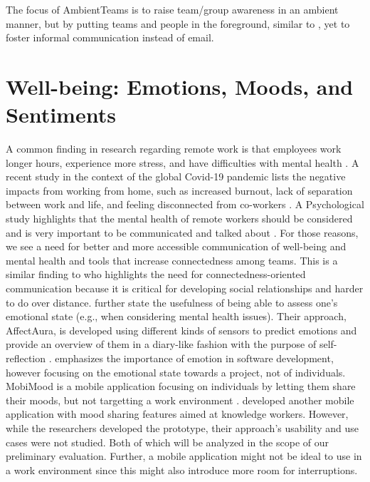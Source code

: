The focus of AmbientTeams is to raise team/group awareness in an ambient manner, but by putting teams and people in the foreground, similar to \autocite{whittaker2004contactmap}, yet to foster informal communication instead of email.

\section{Well-being: Emotions, Moods, and Sentiments}
A common finding in research regarding remote work is that employees work longer hours, experience more stress, and have difficulties with mental health \autocite{mswellbeing, mulki2009set, qualtricksmental}. A recent study in the context of the global Covid-19 pandemic lists the negative impacts from working from home, such as increased burnout, lack of separation between work and life, and feeling disconnected from co-workers \autocite{mswellbeing}. A Psychological study highlights that the mental health of remote workers should be considered and is very important to be communicated and talked about \autocite{grant2013exploration}. For those reasons, we see a need for better and more accessible communication of well-being and mental health and tools that increase connectedness among teams. This is a similar finding to \textcite{kuwabara2002connectedness} who highlights the need for connectedness-oriented communication because it is critical for developing social relationships and harder to do over distance. \textcite{mcduff2012affectaura} further state the usefulness of being able to assess one's emotional state (e.g., when considering mental health issues). Their approach, AffectAura, is developed using different kinds of sensors to predict emotions and provide an overview of them in a diary-like fashion with the purpose of self-reflection \autocite{dullemond2013fixing}. \textcite{guzman2013towards} emphasizes the importance of emotion in software development, however focusing on the emotional state towards a project, not of individuals. MobiMood is a mobile application focusing on individuals by letting them share their moods, but not targetting a work environment \autocite{church2010study}. \textcite{saari2008mobile} developed another mobile application with mood sharing features aimed at knowledge workers. However, while the researchers developed the prototype, their approach's usability and use cases were not studied. Both of which will be analyzed in the scope of our preliminary evaluation. Further, a mobile application might not be ideal to use in a work environment since this might also introduce more room for interruptions.

